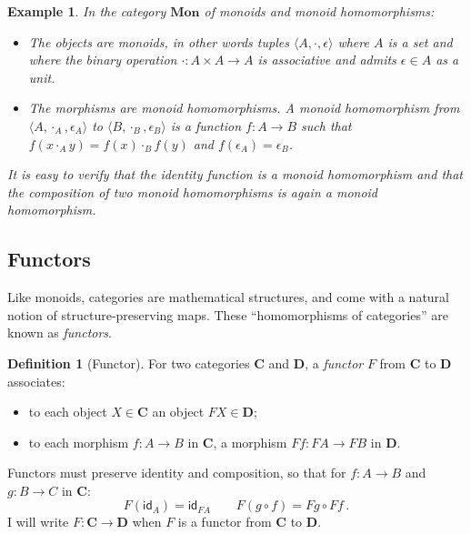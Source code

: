 \documentclass[draft,11pt]{report}
\newtheorem{example}[theorem]{Example}
\theoremstyle{definition}
\newtheorem{definition}[theorem]{Definition}
\newcommand{\kw}[1]{\ensuremath{ \mathsf{#1} }}
\begin{document}
\begin{example} \label{ex:mon} %
In the category $\mathbf{Mon}$ of
monoids and monoid homomorphisms:
\begin{itemize}
  \item The objects are \emph{monoids},
    in other words tuples $\langle A, {\cdot}, \epsilon \rangle$
    where $A$ is a set and
    where the binary operation
    ${\cdot} : A \times A \rightarrow A$ is associative and
    admits $\epsilon \in A$ as a unit.
  \item The morphisms are \emph{monoid homomorphisms}.
    A monoid homomorphism from
    $\langle A, {\cdot_A}, \epsilon_A \rangle$ to
    $\langle B, {\cdot_B}, \epsilon_B \rangle$ is
    a function $f : A \rightarrow B$ such that
    $f(x \cdot_A y) = f(x) \cdot_B f(y)$ and
    $f(\epsilon_A) = \epsilon_B$.
\end{itemize}
It is easy to verify that the identity function
is a monoid homomorphism and that
the composition of two monoid homomorphisms
is again a monoid homomorphism.
\end{example}


\subsection{Functors} %

Like monoids,
categories are mathematical structures,
and come with a natural notion of
structure-preserving maps.
These ``homomorphisms of categories'' are known as \emph{functors}.

\begin{definition}[Functor] \label{def:functor} %
For two categories $\mathbf{C}$ and $\mathbf{D}$,
a \emph{functor} $F$ from $\mathbf{C}$ to $\mathbf{D}$
associates:
\begin{itemize}
  \item
    to each object $X \in \mathbf{C}$ an object $F X \in \mathbf{D}$;
  \item
    to each morphism $f : A \rightarrow B$ in $\mathbf{C}$,
    a morphism $F f : F A \rightarrow F B$ in $\mathbf{D}$.
\end{itemize}
Functors must preserve identity and composition,
so that for
$f : A \rightarrow B$ and
$g : B \rightarrow C$ in $\mathbf{C}$:
\[
  F (\kw{id}_A) = \kw{id}_{F A}
  \qquad
  F (g \circ f) = F g \circ F f
  \,.
\]
I will write $F : \mathbf{C} \rightarrow \mathbf{D}$
when $F$ is a functor from $\mathbf{C}$ to $\mathbf{D}$.
\end{definition}
\end{document}
